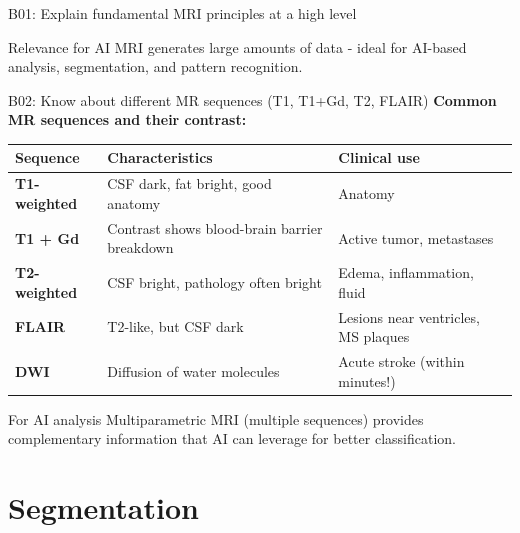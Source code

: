 \documentclass[aspectratio=169, 10pt]{beamer}
\begin{document}
\begin{frame}{B01: Explain fundamental MRI principles at a high level}
    \begin{block}{Relevance for AI}
        MRI generates large amounts of data - ideal for AI-based analysis, segmentation, and pattern recognition.
    \end{block}
\end{frame}

\begin{frame}{B02: Know about different MR sequences (T1, T1+Gd, T2, FLAIR)}
    \textbf{Common MR sequences and their contrast:}

    \vspace{0.2cm}
    \begin{center}
        \footnotesize
        \begin{tabular}{lp{4cm}p{4.5cm}}
            \toprule
            \textbf{Sequence} & \textbf{Characteristics} & \textbf{Clinical use} \\
            \midrule
            \textbf{T1-weighted} & CSF dark, fat bright, good anatomy & Anatomy \\
            \addlinespace
            \textbf{T1 + Gd} & Contrast shows blood-brain barrier breakdown & Active tumor, metastases \\
            \addlinespace
            \textbf{T2-weighted} & CSF bright, pathology often bright & Edema, inflammation, fluid \\
            \addlinespace
            \textbf{FLAIR} & T2-like, but CSF dark & Lesions near ventricles, MS plaques \\
            \addlinespace
            \textbf{DWI} & Diffusion of water molecules & Acute stroke (within minutes!) \\
            \bottomrule
        \end{tabular}
    \end{center}

    \vspace{0.2cm}
    \begin{alertblock}{\footnotesize For AI analysis}
        \footnotesize Multiparametric MRI {\tiny (multiple sequences)} provides complementary information that AI can leverage for better classification.
    \end{alertblock}
\end{frame}

\section{Segmentation}
\end{document}
